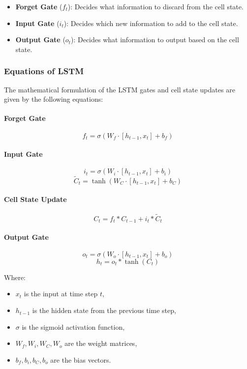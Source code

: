 \begin{itemize}
    \item \textbf{Forget Gate} (\(f_t\)): Decides what information to discard from the cell state.
    \item \textbf{Input Gate} (\(i_t\)): Decides which new information to add to the cell state.
    \item \textbf{Output Gate} (\(o_t\)): Decides what information to output based on the cell state.
\end{itemize}

\subsubsection{Equations of LSTM}
The mathematical formulation of the LSTM gates and cell state updates are given by the following equations:

\paragraph{Forget Gate}
\[
f_t = \sigma(W_f \cdot [h_{t-1}, x_t] + b_f)
\]

\paragraph{Input Gate}
\[
i_t = \sigma(W_i \cdot [h_{t-1}, x_t] + b_i)
\]
\[
\tilde{C}_t = \tanh(W_C \cdot [h_{t-1}, x_t] + b_C)
\]

\paragraph{Cell State Update}
\[
C_t = f_t * C_{t-1} + i_t * \tilde{C}_t
\]

\paragraph{Output Gate}
\[
o_t = \sigma(W_o \cdot [h_{t-1}, x_t] + b_o)
\]
\[
h_t = o_t * \tanh(C_t)
\]

Where:
\begin{itemize}
    \item \(x_t\) is the input at time step \(t\),
    \item \(h_{t-1}\) is the hidden state from the previous time step,
    \item \(\sigma\) is the sigmoid activation function,
    \item \(W_f, W_i, W_C, W_o\) are the weight matrices,
    \item \(b_f, b_i, b_C, b_o\) are the bias vectors.
\end{itemize}


